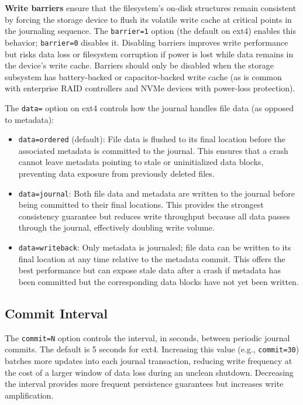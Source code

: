 \textbf{Write barriers} ensure that the filesystem's on-disk structures remain consistent by forcing the storage device to flush its volatile write cache at critical points in the journaling sequence. The \texttt{barrier=1} option (the default on ext4) enables this behavior; \texttt{barrier=0} disables it. Disabling barriers improves write performance but risks data loss or filesystem corruption if power is lost while data remains in the device's write cache. Barriers should only be disabled when the storage subsystem has battery-backed or capacitor-backed write cache (as is common with enterprise RAID controllers and NVMe devices with power-loss protection).

The \texttt{data=} option on ext4 controls how the journal handles file data (as opposed to metadata):

\begin{itemize}
  \item \texttt{data=ordered} (default): File data is flushed to its final location before the associated metadata is committed to the journal. This ensures that a crash cannot leave metadata pointing to stale or uninitialized data blocks, preventing data exposure from previously deleted files.
  \item \texttt{data=journal}: Both file data and metadata are written to the journal before being committed to their final locations. This provides the strongest consistency guarantee but reduces write throughput because all data passes through the journal, effectively doubling write volume.
  \item \texttt{data=writeback}: Only metadata is journaled; file data can be written to its final location at any time relative to the metadata commit. This offers the best performance but can expose stale data after a crash if metadata has been committed but the corresponding data blocks have not yet been written.
\end{itemize}

\subsection{Commit Interval}

The \texttt{commit=N} option controls the interval, in seconds, between periodic journal commits. The default is 5 seconds for ext4. Increasing this value (e.g., \texttt{commit=30}) batches more updates into each journal transaction, reducing write frequency at the cost of a larger window of data loss during an unclean shutdown. Decreasing the interval provides more frequent persistence guarantees but increases write amplification.

